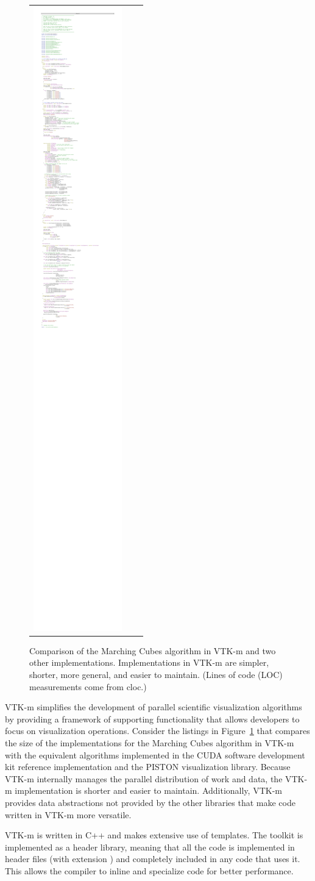 \begin{figure}[htb]
\begin{tabular}{ccc}
    \includegraphics[width=.75in]{images/MCCompareVTKm}
  \end{tabular}
  \caption[Comparison of Marching Cubes implementations.]{Comparison of the
    Marching Cubes algorithm in VTK-m and two other implementations.
    Implementations in VTK-m are simpler, shorter, more general, and easier
    to maintain. (Lines of code (LOC) measurements come from cloc.)}
  \label{fig:MCCompare}
\end{figure}

VTK-m simplifies the development of parallel scientific visualization
algorithms by providing a framework of supporting functionality that allows
developers to focus on visualization operations. Consider the listings in
Figure~\ref{fig:MCCompare} that compares the size of the implementations
for the Marching Cubes algorithm in VTK-m with the equivalent algorithms
implemented in the CUDA software development kit reference implementation
and the PISTON visualization library. Because VTK-m internally manages the
parallel distribution of work and data, the VTK-m implementation is shorter
and easier to maintain. Additionally, VTK-m provides data abstractions not
provided by the other libraries that make code written in VTK-m more
versatile.

\begin{didyouknow}
  VTK-m is written in C++ and makes extensive use of templates. The toolkit
  is implemented as a header library, meaning that all the code is
  implemented in header files (with extension ) and
  completely included in any code that uses it. This allows the compiler to
  inline and specialize code for better performance.
\end{didyouknow}


